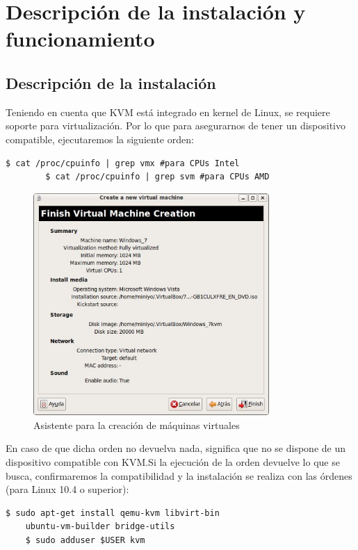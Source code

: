 \documentclass[11pt]{article}
\begin{document}
\section{Descripción de la instalación y funcionamiento}
\subsection{Descripción de la instalación}
Teniendo en cuenta que KVM está integrado en kernel de Linux, se requiere soporte para virtualización. Por lo que para asegurarnos de tener un dispositivo compatible, ejecutaremos la siguiente orden:
	\begin{lstlisting}[frame=single]
		$ cat /proc/cpuinfo | grep vmx #para CPUs Intel
		$ cat /proc/cpuinfo | grep svm #para CPUs AMD
	\end{lstlisting}

\begin{figure}
\centering
\caption{Asistente para la creación de máquinas virtuales}
\label{Asistente}
\includegraphics[width=0.8\textwidth, scale=1]{ejemplo.jpg}
\end{figure}
	
En caso de que dicha orden no devuelva nada, significa que no se dispone de un dispositivo compatible con KVM.Si la ejecución de la orden devuelve lo que se busca, confirmaremos la compatibilidad y la instalación se realiza con las órdenes (para Linux
10.4 o superior):

	\begin{lstlisting}[frame=single]
	$ sudo apt-get install qemu-kvm libvirt-bin 
	ubuntu-vm-builder bridge-utils
	$ sudo adduser $USER kvm
	\end{lstlisting}
	
\end{document}
